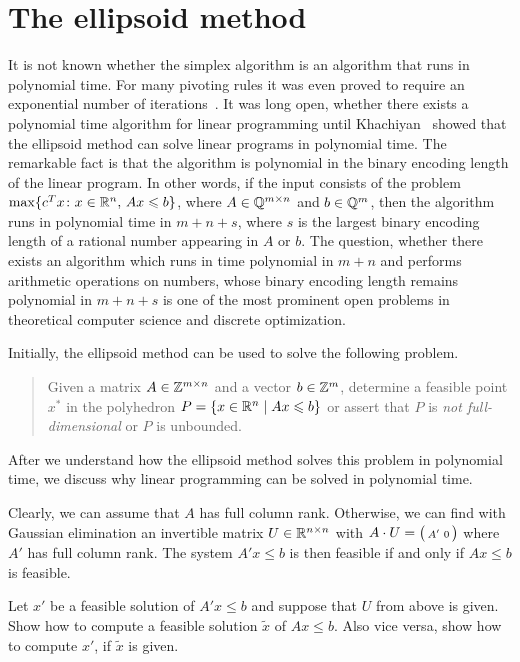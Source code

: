 \chapter{The ellipsoid method}
\label{el:cha:ellipsoid-method}


It is not known whether the  simplex algorithm is  an algorithm that
runs in polynomial 
time. For many pivoting rules it was even proved to require an
exponential number of iterations~\cite{MR0332165}.  It was long open, whether there exists a polynomial time
algorithm for linear programming until Khachiyan~\cite{Khachiyan79}
showed that the ellipsoid method\cite{Shor77,MR736268} can solve
linear programs in polynomial time. The remarkable fact is that the
algorithm is polynomial in the binary encoding length of the linear
program. In other words, if the input consists of the problem
$\max\{c^Tx\colon x \in \mathbb{R}^n, \, Ax \leqslant b\}$, where $A\in \mathbb{Q}^{m\times n}$ and $b
\in \mathbb{Q}^m$, then the algorithm runs in polynomial time in $m+n+s$, where
$s$ is the largest binary encoding length of a rational number
appearing in $A$ or $b$. The question, whether there exists an
algorithm which runs in time polynomial in $m+n$ and performs
arithmetic operations on numbers, whose binary encoding length remains
polynomial in $m+n+s$ is one of the most prominent open problems in
theoretical computer science and discrete optimization.

Initially, the ellipsoid method can be used to solve the following
problem. 
\begin{quote}
  Given a matrix $A \in \mathbb{Z}^{m\times n}$ and a vector $b \in \mathbb{Z}^m$, determine a
  feasible point $x^*$ in the polyhedron $P = \{ x \in \mathbb{R}^n \mid Ax\leqslant b\}$ or
  assert that $P$ is \emph{not full-dimensional} or $P$ is unbounded.   
\end{quote}
%
After we understand how the ellipsoid method solves this problem in
polynomial time, we discuss why linear programming can be solved in
polynomial time. 

Clearly, we can assume that $A$ has full column rank. Otherwise, we
can find with Gaussian elimination an invertible matrix $U \in
\mathbb{R}^{n\times n}$ with $A \cdot U = \big(\begin{smallmatrix} A' & 0 \end{smallmatrix}\big)$ where $A'$ has full column rank. The
system $A'x\leq b$ is then feasible if and only if $Ax\leq b$ is feasible. 

\begin{exercise}
  \label{el:ex:6}
  Let $x'$ be a feasible solution of $A'x\leq b$ and suppose that $U$ from
  above is given. Show how to compute a feasible solution $\tilde{x}$ of
  $Ax\leq b$. Also vice versa, show how to compute $x'$, if 
  $\tilde{x}$ is
  given. 
\end{exercise}

